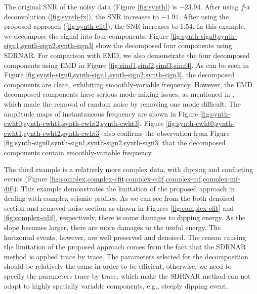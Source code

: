 The original SNR of the noisy data (Figure \ref{fig:synth}) is $-23.94$. After using $f$-$x$ deconvolution (\ref{fig:synth-fx}), the SNR increases to $-1.91$. After using the proposed approach (\ref{fig:synth-cfit}), the SNR increases to $1.54$. In this example, we decompose the signal into four components. Figure \ref{fig:synth-sign0,synth-sign1,synth-sign2,synth-sign3} show the decomposed four components using SDRNAR. For comparison with EMD, we also demonstrate the four decomposed components using EMD in Figure \ref{fig:simf1,simf2,simf3,simf4}. As can be seen in Figure \ref{fig:synth-sign0,synth-sign1,synth-sign2,synth-sign3}, the decomposed components are clean, exhibiting smoothly-variable frequency. However, the EMD decomposed components have serious mode-mixing issues, as mentioned in \cite[]{kopecky2010,yangkang2014}, which made the removal of random noise by removing one mode difficult. The amplitude maps of instantaneous frequency are shown in Figure \ref{fig:synth-cwht0,synth-cwht1,synth-cwht2,synth-cwht3}. Figure \ref{fig:synth-cwht0,synth-cwht1,synth-cwht2,synth-cwht3} also confirms the observation from Figure \ref{fig:synth-sign0,synth-sign1,synth-sign2,synth-sign3} that the decomposed components contain smoothly-variable frequency.

The third example is a relatively more complex data, with dipping and conflicting events (Figure \ref{fig:complex,complex-cfit,complex-cdif,complex-mf,complex-mf-dif}). This example demonstrates the limitation of the proposed approach in dealing with complex seismic profiles. As we can see from the both denoised section and removed noise section as shown in Figures \ref{fig:complex-cfit} and \ref{fig:complex-cdif}, respectively, there is some damages to dipping energy. As the slope becomes larger, there are more damages to the useful energy. The horizontal events, however, are well preserved and denoised. The reason causing the limitation of the proposed approach comes from the fact that the SDRNAR method is applied trace by trace. The parameters selected for the decomposition should be relatively the same in order to be efficient, otherwise, we need to specify the parameters trace by trace, which make the SDRNAR method can not adapt to highly spatially variable components, e.g., steeply dipping event. 

